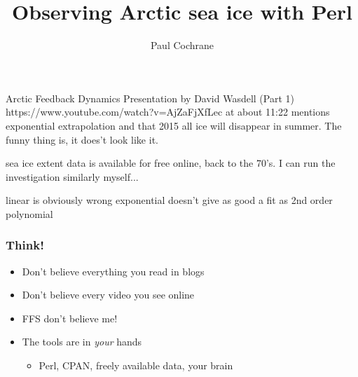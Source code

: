 \documentclass{beamer}
\title{Observing Arctic sea ice with Perl}
\author{Paul Cochrane}
\begin{document}
\begin{frame}
    \titlepage
\end{frame}

\begin{frame}
Arctic Feedback Dynamics Presentation by David Wasdell (Part 1)
https://www.youtube.com/watch?v=AjZaFjXfLec
at about 11:22 mentions exponential extrapolation and that 2015 all ice will
disappear in summer.  The funny thing is, it does't look like it.

sea ice extent data is available for free online, back to the 70's.  I can
run the investigation similarly myself...
\end{frame}


\begin{frame}
linear is obviously wrong
exponential doesn't give as good a fit as 2nd order polynomial
\end{frame}

\begin{frame}
    \frametitle{Think!}
    \begin{itemize}
	\item Don't believe everything you read in blogs
	\item Don't believe every video you see online
	\item FFS don't believe me!
	\item The tools are in \emph{your} hands
	    \begin{itemize}
		\item Perl, CPAN, freely available data, your brain
	    \end{itemize}
    \end{itemize}
\end{frame}


\end{document}
